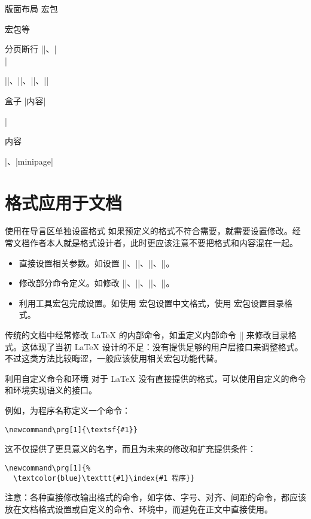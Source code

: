 \begin{frame}{版面布局}
 宏包

 宏包等
\end{frame}

\begin{frame}[fragile]{分页断行}
|\linebreak|、|\\|

|\pagebreak|、|\newpage|、|\clearpage|、|\cleardoublepage|
\end{frame}

\begin{frame}[fragile]{盒子}
|\mbox{内容}|

|\parbox{4em}{内容}|、|minipage|
\end{frame}

\section{格式应用于文档}

\begin{frame}[fragile]{使用在导言区单独设置格式}
如果预定义的格式不符合需要，就需要设置修改。经常文档作者本人就是格式设计者，此时更应该注意不要把格式和内容混在一起。\pause
\begin{itemize}[<+->]
\item 直接设置相关参数。如设置 |\parindent|、|\parskip|、|\linespread|、|\pagestyle|。
\item 修改部分命令定义。如修改 |\thesection|、||、|\descriptionlabel|、|\figurename|。
\item 利用工具宏包完成设置。如使用  宏包设置中文格式，使用  宏包设置目录格式。
\end{itemize}\pause
传统的文档中经常修改 \LaTeX{} 的内部命令，如重定义内部命令 |\l@section| 来修改目录格式。这体现了当初 \LaTeX{} 设计的不足：没有提供足够的用户层接口来调整格式。不过这类方法比较晦涩，一般应该使用相关宏包功能代替。
\end{frame}

\begin{frame}[fragile]{利用自定义命令和环境}
对于 \LaTeX{} 没有直接提供的格式，可以使用自定义的命令和环境实现语义的接口。\pause

例如，为程序名称定义一个命令：
\begin{Verbatim}
\newcommand\prg[1]{\textsf{#1}}
\end{Verbatim}
\pause
这不仅提供了更具意义的名字，而且为未来的修改和扩充提供条件：
\begin{Verbatim}
\newcommand\prg[1]{%
  \textcolor{blue}\texttt{#1}\index{#1 程序}}
\end{Verbatim}
\pause

\alert{注意：}各种直接修改输出格式的命令，如字体、字号、对齐、间距的命令，都应该放在文档格式设置或自定义的命令、环境中，而避免在正文中直接使用。
\end{frame}

